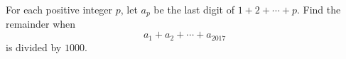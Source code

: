 For each positive integer $p$, let $a_p$ be the last digit of $1+2+\cdots+p$. Find the remainder when
\[a_1+a_2+\cdots+a_{2017}\]
is divided by $1000$.
